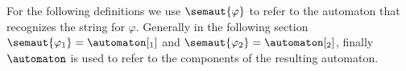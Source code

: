 For the following definitions we use $\semaut{\varphi}$ to refer to the automaton that recognizes the string for $\varphi$.
Generally in the following section $\semaut{\varphi_1}=\automaton[_1]$ and $\semaut{\varphi{_2}}=\automaton[_2]$, finally $\automaton$ is used to refer to the components of the resulting automaton.







